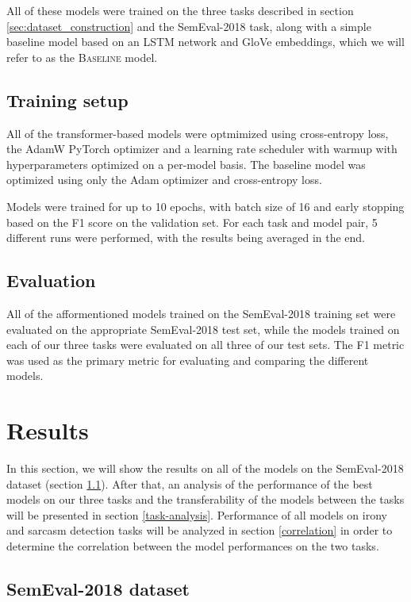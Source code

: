 \documentclass[10pt, a4paper]{article}
\begin{document}
All of these models were trained on the three tasks described in section \ref{sec:dataset_construction} and the SemEval-2018
task, along with a simple baseline model based on an LSTM network and GloVe embeddings, which we will refer to as the
\textsc{Baseline} model. 

\subsection{Training setup}
All of the transformer-based models were optmimized using cross-entropy loss, the AdamW PyTorch optimizer and a
learning rate scheduler with warmup with hyperparameters optimized on a per-model basis. The baseline model
was optimized using only the Adam optimizer and cross-entropy loss.

Models were trained for up to 10 epochs, with batch size of 16 and early stopping based on the F1 score on the validation set.
For each task and model pair, 5 different runs were performed, with the results being averaged in the end.

\subsection{Evaluation}
All of the afformentioned models trained on the SemEval-2018 training set were evaluated on the appropriate 
SemEval-2018 test set, while the models trained on each of our three tasks were evaluated on all three of our test sets. 
The F1 metric was used as the primary metric for evaluating and comparing the different models.

\section{Results}

In this section, we will show the results on all of the models on the SemEval-2018 dataset (section \ref{semeval-results}).
After that, an analysis of the performance of the best models on our three tasks and the transferability of the models between
the tasks will be presented in section \ref{task-analysis}. Performance of all models on irony and sarcasm detection tasks
will be analyzed in section \ref{correlation} in order to determine the correlation between the model performances on the two tasks.

\subsection{SemEval-2018 dataset}\label{semeval-results}
\end{document}
